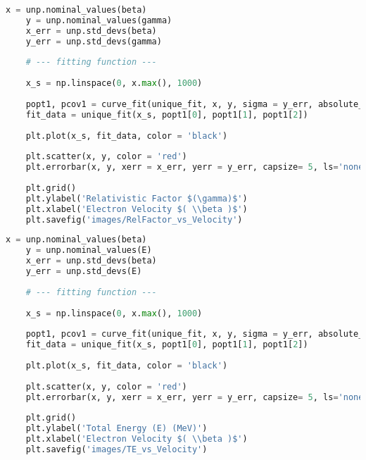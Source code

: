 \begin{lstlisting}[language = Python, frame = single]
    x = unp.nominal_values(beta)
    y = unp.nominal_values(gamma)
    x_err = unp.std_devs(beta)
    y_err = unp.std_devs(gamma)
    
    # --- fitting function --- 
    
    x_s = np.linspace(0, x.max(), 1000)
    
    popt1, pcov1 = curve_fit(unique_fit, x, y, sigma = y_err, absolute_sigma = True, p0 = [.1, 3, 1])
    fit_data = unique_fit(x_s, popt1[0], popt1[1], popt1[2])
    
    plt.plot(x_s, fit_data, color = 'black')
    
    plt.scatter(x, y, color = 'red')
    plt.errorbar(x, y, xerr = x_err, yerr = y_err, capsize= 5, ls='none', color = 'red')
    
    plt.grid()
    plt.ylabel('Relativistic Factor $(\gamma)$')
    plt.xlabel('Electron Velocity $( \\beta )$')
    plt.savefig('images/RelFactor_vs_Velocity')
\end{lstlisting}

\begin{lstlisting}[language = Python, frame = single]
    x = unp.nominal_values(beta)
    y = unp.nominal_values(E)
    x_err = unp.std_devs(beta)
    y_err = unp.std_devs(E)
    
    # --- fitting function --- 
    
    x_s = np.linspace(0, x.max(), 1000)
    
    popt1, pcov1 = curve_fit(unique_fit, x, y, sigma = y_err, absolute_sigma = True, p0 = [.1, 3, 1])
    fit_data = unique_fit(x_s, popt1[0], popt1[1], popt1[2])
    
    plt.plot(x_s, fit_data, color = 'black')
    
    plt.scatter(x, y, color = 'red')
    plt.errorbar(x, y, xerr = x_err, yerr = y_err, capsize= 5, ls='none', color = 'red')
    
    plt.grid()
    plt.ylabel('Total Energy (E) (MeV)')
    plt.xlabel('Electron Velocity $( \\beta )$')
    plt.savefig('images/TE_vs_Velocity')
\end{lstlisting}

